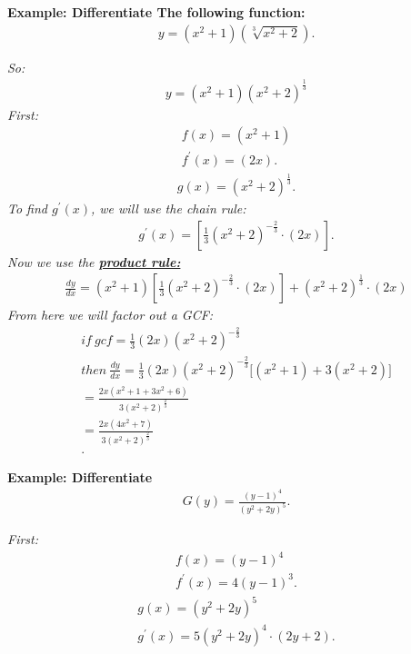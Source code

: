\documentclass{report}
\begin{document}
  \bigbreak \noindent 
  \begin{mdframed}
    \textbf{Example: Differentiate The following function:}
    \begin{align*}
      y = (x^{2}+1)(\sqrt[3]{x^{2}+2})
    .\end{align*}
  \end{mdframed}
  \bigbreak \noindent
  \textit{So:}
  \begin{align*}
   y = (x^{2} +1)(x^{2}+2)^{\frac{1}{3}} 
  \end{align*}
  \bigbreak \noindent 
  \textit{First:}
  \begin{align*}
    f(x) = (x^{2}+1) \\
    f^{\prime}(x) = (2x)
  .\end{align*}
  \begin{align*}
    g(x) = (x^2+2)^{\frac{1}{3}}
  .\end{align*}
  \bigbreak \noindent
  \textit{To find $g^{\prime}(x)$, we will use the chain rule:}
  \begin{align*}
    g^{\prime}(x) = [\frac{1}{3}(x^{2}+2)^{-\frac{2}{3}} \cdot (2x)] 
  .\end{align*}
  \bigbreak \noindent 
  \textit{Now we use the \textbf{\textit{\underline{product rule:}}}}
  \begin{align*}
    \frac{dy}{dx} = (x^2+1)[\frac{1}{3}(x^2+2)^{-\frac{2}{3}} \cdot (2x)] + (x^2+2)^{\frac{1}{3}} \cdot (2x)
  \end{align*}
  \bigbreak \noindent 
  \textit{From here we will factor out a GCF:}
  \begin{align*}
    if\ gcf=\frac{1}{3}(2x)(x^{2}+2)^{-\frac{2}{3}} \\
    then\ \frac{dy}{dx} = \frac{1}{3}(2x)(x^{2}+2)^{-\frac{2}{3}}\bigg[(x^{2}+1)+3(x^{2}+2)\bigg] \\
    = \frac{2x(x^{2}+1+3x^{2}+6)}{3(x^{2}+2)^{\frac{2}{3}}} \\
    = \frac{2x(4x^{2}+7)}{3(x^{2}+2)^{\frac{2}{3}}} \\
  .\end{align*}

  \bigbreak \noindent 
  \begin{mdframed}
    \textbf{Example: Differentiate}
    \begin{align*}
      G(y) = \frac{(y-1)^{4}}{(y^{2}+2y)^5}
    .\end{align*}
  \end{mdframed}
  \bigbreak \noindent 
  \textit{First:}
  \begin{align*}
    f(x) = (y-1)^{4} \\ 
    f^{\prime}(x) = 4(y-1)^{3}
  .\end{align*}
  \begin{align*}
    g(x) = (y^{2}+2y)^{5} \\
    g^{\prime}(x) = 5(y^{2}+2y)^{4} \cdot (2y+2)
  .\end{align*}
  
\end{document}
